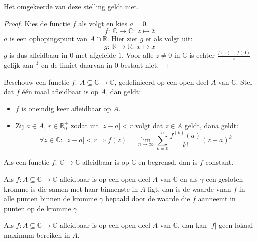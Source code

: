 \documentclass[main.tex]{subfiles}
\begin{document}
\begin{tvb}
  Het omgekeerde van deze stelling geldt niet.

  \begin{proof}
    Kies de functie $f$ als volgt en kies $a=0$.
    \[ f:\ \mathbb{C} \rightarrow \mathbb{C}:\ z \mapsto \overline{z} \]
    $a$ is een ophopingspunt van $A \cap \mathbb{R}$.
    Hier ziet $g$ er als volgt uit:
    \[ g:\ \mathbb{R} \rightarrow \mathbb{R}:\ x \mapsto x \]
    $g$ is dus afleidbaar in $0$ met afgeleide $1$.
    Voor alle $z \neq 0$ in $\mathbb{C}$ is echter $\frac{f(z)-f(0)}{z}$ gelijk aan $\frac{\overline{z}}{z}$ en de limiet daarvan in $0$ bestaat niet.
  \end{proof}
\end{tvb}


\begin{bst}
  Beschouw een functie $f:\ A \subseteq \mathbb{C} \rightarrow \mathbb{C}$, gedefinieerd op een open deel $A$ van $\mathbb{C}$.
  Stel dat $f$ \'e\'en maal afleidbaar is op $A$, dan geldt:
  \begin{itemize}
  \item $f$ is oneindig keer afleidbaar op $A$.
  \item Zij $a\in A$, $r\in \mathbb{R}_{0}^{+}$ zodat uit $|z-a|< r$ volgt dat $z\in A$ geldt, dana geldt:
    \[ \forall z\in \mathbb{C}:\ |z-a|< r \Rightarrow f(z) = \lim_{n \rightarrow \infty}\sum_{k=0}^{n}\frac{f^{(k)}(a)}{k!}(z-a)^{k} \]
  \end{itemize}
\zb
\end{bst}

\begin{st}
  Als een functie $f:\ \mathbb{C} \rightarrow \mathbb{C}$ afleidbaar is op $\mathbb{C}$ en begrensd, dan is $f$ constant.
\zb
\end{st}

\begin{st}
  Als $f: A \subseteq \mathbb{C} \rightarrow \mathbb{C}$ afleidbaar is op een open deel $A$ van $\mathbb{C}$ en als $\gamma$ een gesloten kromme is die samen met haar binnenste in $A$ ligt, dan is de waarde vnan $f$ in alle punten binnen de kromme $\gamma$ bepaald door de waarde die $f$ aanneemt in punten op de kromme $\gamma$.
\zb
\end{st}

\begin{st}
  Als $f: A \subseteq \mathbb{C} \rightarrow \mathbb{C}$ afleidbaar is op een open deel $A$ van $\mathbb{C}$, dan kan $|f|$ geen lokaal maximum bereiken in $A$.
\zb
\end{st}
\end{document}
